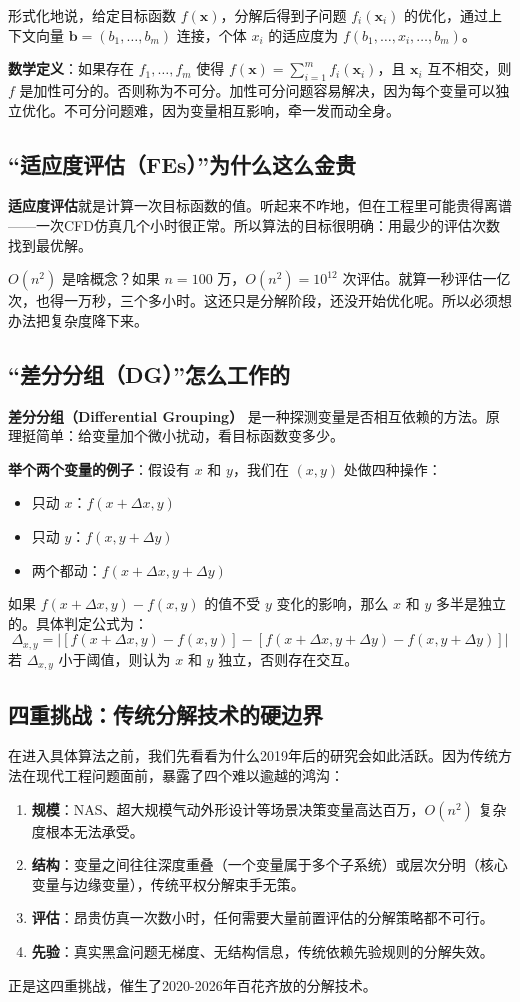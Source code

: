 形式化地说，给定目标函数 $f(\mathbf{x})$，分解后得到子问题 $f_i(\mathbf{x}_i)$ 的优化，通过上下文向量 $\mathbf{b} = (b_1,\ldots,b_m)$ 连接，个体 $x_i$ 的适应度为 $f(b_1,\ldots,x_i,\ldots,b_m)$。

\textbf{数学定义}：如果存在 $f_1,\ldots,f_m$ 使得 $f(\mathbf{x}) = \sum_{i=1}^m f_i(\mathbf{x}_i)$，且 $\mathbf{x}_i$ 互不相交，则 $f$ 是加性可分的。否则称为不可分。加性可分问题容易解决，因为每个变量可以独立优化。不可分问题难，因为变量相互影响，牵一发而动全身。

\subsection{“适应度评估（FEs）”为什么这么金贵}
\textbf{适应度评估}就是计算一次目标函数的值。听起来不咋地，但在工程里可能贵得离谱——一次CFD仿真几个小时很正常。所以算法的目标很明确：用最少的评估次数找到最优解。

$O(n^2)$ 是啥概念？如果 $n=100$ 万，$O(n^2)=10^{12}$ 次评估。就算一秒评估一亿次，也得一万秒，三个多小时。这还只是分解阶段，还没开始优化呢。所以必须想办法把复杂度降下来。

\subsection{“差分分组（DG）”怎么工作的}
\textbf{差分分组（Differential Grouping）} 是一种探测变量是否相互依赖的方法。原理挺简单：给变量加个微小扰动，看目标函数变多少。

\textbf{举个两个变量的例子}：假设有 $x$ 和 $y$，我们在 $(x,y)$ 处做四种操作：
\begin{itemize}
    \item 只动 $x$：$f(x+\Delta x, y)$
    \item 只动 $y$：$f(x, y+\Delta y)$
    \item 两个都动：$f(x+\Delta x, y+\Delta y)$
\end{itemize}
如果 $f(x+\Delta x, y) - f(x,y)$ 的值不受 $y$ 变化的影响，那么 $x$ 和 $y$ 多半是独立的。具体判定公式为：
$$\Delta_{x,y} = | [f(x+\Delta x, y) - f(x,y)] - [f(x+\Delta x, y+\Delta y) - f(x, y+\Delta y)] |$$
若 $\Delta_{x,y}$ 小于阈值，则认为 $x$ 和 $y$ 独立，否则存在交互。

\subsection{四重挑战：传统分解技术的硬边界}
在进入具体算法之前，我们先看看为什么2019年后的研究会如此活跃。因为传统方法在现代工程问题面前，暴露了四个难以逾越的鸿沟：
\begin{enumerate}
    \item \textbf{规模}：NAS、超大规模气动外形设计等场景决策变量高达百万，$O(n^2)$ 复杂度根本无法承受。
    \item \textbf{结构}：变量之间往往深度重叠（一个变量属于多个子系统）或层次分明（核心变量与边缘变量），传统平权分解束手无策。
    \item \textbf{评估}：昂贵仿真一次数小时，任何需要大量前置评估的分解策略都不可行。
    \item \textbf{先验}：真实黑盒问题无梯度、无结构信息，传统依赖先验规则的分解失效。
\end{enumerate}
正是这四重挑战，催生了2020-2026年百花齐放的分解技术。

